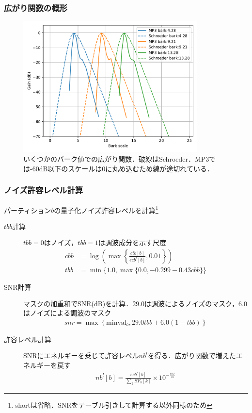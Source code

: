 \documentclass[14pt,xcolor=dvipsnames,table,dvipdfmx]{beamer}
\begin{document}
\begin{frame}[c]
    \frametitle{広がり関数の概形}
    \begin{figure}
        \includegraphics[width=95mm]{./figs/spreading_functons.pdf}
        \caption*{いくつかのバーク値での広がり関数．破線はSchroeder\cite{schroeder1979optimizing}．MP3では-60dB以下のスケールは0に丸め込むため線が途切れている．}
    \end{figure}
\end{frame}

\begin{frame}[c]
    \frametitle{ノイズ許容レベル計算}
    パーティション$b$の量子化ノイズ許容レベルを計算\footnote{shortは省略．SNRをテーブル引きして計算する以外同様のため}
    \small
    \begin{description}
        \item[$tbb$計算] $tbb=0$はノイズ，$tbb=1$は調波成分を示す尺度
            \begin{align}
                cbb &= \log \left( \max \left\{ \frac{ctb[b]}{ecb^{l}[b]}, 0.01 \right\} \right) \\
                tbb &= \min\{ 1.0, \max\{ 0.0, - 0.299 - 0.43 cbb \} \}
            \end{align}
        \item[SNR計算] マスクの加重和でSNR(dB)を計算．$29.0$は調波によるノイズのマスク，$6.0$はノイズによる調波のマスク
            \begin{align}
                snr = \max \left\{ \mathrm{minval}_{b}, 29.0 tbb + 6.0 (1 - tbb) \right\}
            \end{align}
        \item[許容レベル計算] SNRにエネルギーを乗じて許容レベル$nb^{l}$を得る．広がり関数で増えたエネルギーを戻す
            \begin{align}
                nb^{l}[b] = \frac{ecb^{l}[b]}{\sum_{k} SF_{b}[k]} \times 10^{-\frac{snr}{10}}
            \end{align}
    \end{description}
\end{frame}
\end{document}
